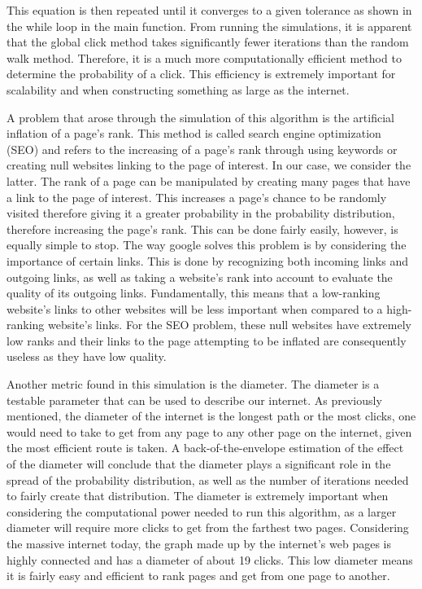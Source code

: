 \documentclass{article}
\begin{document}
This equation is then repeated until it converges to a given tolerance as shown in the while loop in the main function. From running the simulations, it is apparent that the global click method takes significantly fewer iterations than the random walk method. Therefore, it is a much more computationally efficient method to determine the probability of a click. This efficiency is extremely important for scalability and when constructing something as large as the internet. 

A problem that arose through the simulation of this algorithm is the artificial inflation of a page's rank. This method is called search engine optimization (SEO) and refers to the increasing of a page's rank through using keywords or creating null websites linking to the page of interest. In our case, we consider the latter. The rank of a page can be manipulated by creating many pages that have a link to the page of interest. This increases a page's chance to be randomly visited therefore giving it a greater probability in the probability distribution, therefore increasing the page's rank. This can be done fairly easily, however, is equally simple to stop. The way google solves this problem is by considering the importance of certain links. This is done by recognizing both incoming links and outgoing links, as well as taking a website's rank into account to evaluate the quality of its outgoing links. Fundamentally, this means that a low-ranking website’s links to other websites will be less important when compared to a high-ranking website’s links. For the SEO problem, these null websites have extremely low ranks and their links to the page attempting to be inflated are consequently useless as they have low quality.

Another metric found in this simulation is the diameter. The diameter is a testable parameter that can be used to describe our internet. As previously mentioned, the diameter of the internet is the longest path or the most clicks, one would need to take to get from any page to any other page on the internet, given the most efficient route is taken.  A back-of-the-envelope estimation of the effect of the diameter will conclude that the diameter plays a significant role in the spread of the probability distribution, as well as the number of iterations needed to fairly create that distribution. The diameter is extremely important when considering the computational power needed to run this algorithm, as a larger diameter will require more clicks to get from the farthest two pages. Considering the massive internet today, the graph made up by the internet’s web pages is highly connected and has a diameter of about 19 clicks. This low diameter means it is fairly easy and efficient to rank pages and get from one page to another.
\end{document}
